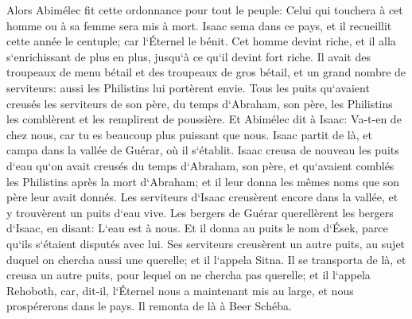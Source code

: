 \verse Alors Abimélec fit cette ordonnance pour tout le peuple: Celui qui touchera à cet homme ou à sa femme sera mis à mort. 
\verse Isaac sema dans ce pays, et il recueillit cette année le centuple; car l`Éternel le bénit. 
\verse Cet homme devint riche, et il alla s`enrichissant de plus en plus, jusqu`à ce qu`il devint fort riche. 
\verse Il avait des troupeaux de menu bétail et des troupeaux de gros bétail, et un grand nombre de serviteurs: aussi les Philistins lui portèrent envie. 
\verse Tous les puits qu`avaient creusés les serviteurs de son père, du temps d`Abraham, son père, les Philistins les comblèrent et les remplirent de poussière. 
\verse Et Abimélec dit à Isaac: Va-t-en de chez nous, car tu es beaucoup plus puissant que nous. 
\verse Isaac partit de là, et campa dans la vallée de Guérar, où il s`établit. 
\verse Isaac creusa de nouveau les puits d`eau qu`on avait creusés du temps d`Abraham, son père, et qu`avaient comblés les Philistins après la mort d`Abraham; et il leur donna les mêmes noms que son père leur avait donnés. 
\verse Les serviteurs d`Isaac creusèrent encore dans la vallée, et y trouvèrent un puits d`eau vive. 
\verse Les bergers de Guérar querellèrent les bergers d`Isaac, en disant: L`eau est à nous. Et il donna au puits le nom d`Ések, parce qu`ils s`étaient disputés avec lui. 
\verse Ses serviteurs creusèrent un autre puits, au sujet duquel on chercha aussi une querelle; et il l`appela Sitna. 
\verse Il se transporta de là, et creusa un autre puits, pour lequel on ne chercha pas querelle; et il l`appela Rehoboth, car, dit-il, l`Éternel nous a maintenant mis au large, et nous prospérerons dans le pays. 
\verse Il remonta de là à Beer Schéba. 
